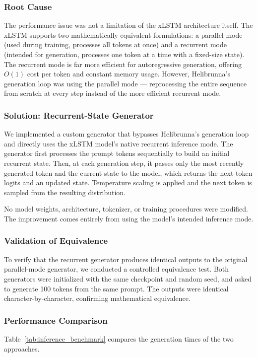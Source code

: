 \documentclass[conference]{IEEEtran}
\begin{document}
\subsubsection{Root Cause}
The performance issue was not a limitation of the xLSTM architecture itself. The xLSTM supports two mathematically equivalent formulations: a parallel mode (used during training, processes all tokens at once) and a recurrent mode (intended for generation, processes one token at a time with a fixed-size state). The recurrent mode is far more efficient for autoregressive generation, offering $O(1)$ cost per token and constant memory usage. However, Helibrunna's generation loop was using the parallel mode --- reprocessing the entire sequence from scratch at every step instead of the more efficient recurrent mode.

\subsubsection{Solution: Recurrent-State Generator}
We implemented a custom generator that bypasses Helibrunna's generation loop and directly uses the xLSTM model's native recurrent inference mode. The generator first processes the prompt tokens sequentially to build an initial recurrent state. Then, at each generation step, it passes only the most recently generated token and the current state to the model, which returns the next-token logits and an updated state. Temperature scaling is applied and the next token is sampled from the resulting distribution.

No model weights, architecture, tokenizer, or training procedures were modified. The improvement comes entirely from using the model's intended inference mode.

\subsubsection{Validation of Equivalence}
To verify that the recurrent generator produces identical outputs to the original parallel-mode generator, we conducted a controlled equivalence test. Both generators were initialized with the same checkpoint and random seed, and asked to generate 100 tokens from the same prompt. The outputs were identical character-by-character, confirming mathematical equivalence.

\subsubsection{Performance Comparison}
Table~\ref{tab:inference_benchmark} compares the generation times of the two approaches.
\end{document}
